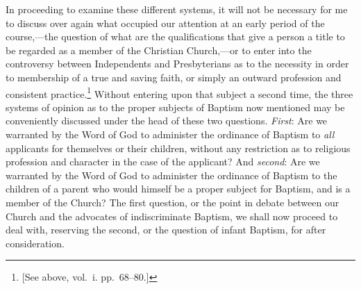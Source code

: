 \documentclass[
]{book}
\begin{document}
In proceeding to examine these different systems, it will not be necessary for me to discuss over again what occupied our attention at an early period of the course,---the question of what are the qualifications that give a person a title to be regarded as a member of the Christian Church,---or to enter into the controversy between Independents and Presbyterians as to the necessity in order to membership of a true and saving faith, or simply an outward profession and consistent practice.\footnote{{[}See above, vol.~i. pp.~68--80.{]}} Without entering upon that subject a second time, the three systems of opinion as to the proper subjects of Baptism now mentioned may be conveniently discussed under the head of these two questions. \emph{First}: Are we warranted by the Word of God to administer the ordinance of Baptism to \emph{all} applicants for themselves or their children, without any restriction as to religious profession and character in the case of the applicant? And \emph{second}: Are we warranted by the Word of God to administer the ordinance of Baptism to the children of a parent who would himself be a proper subject for Baptism, and is a member of the Church? The first question, or the point in debate between our Church and the advocates of indiscriminate Baptism, we shall now proceed to deal with, reserving the second, or the question of infant Baptism, for after consideration.
\end{document}
